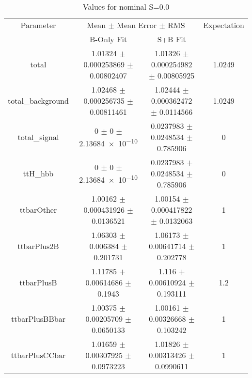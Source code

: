 \begin{table}
\centering
\caption{Values for nominal S=0.0}
\begin{tabular}{cccc}
\toprule
Parameter & \multicolumn{2}{c}{Mean $\pm$ Mean Error $\pm$ RMS} & Expectation\\
 & B-Only Fit & S+B Fit & \\
\midrule
total & \num{1.01324} $\pm$ \num{0.000253869} $\pm$ \num{0.00802407} & \num{1.01326} $\pm$ \num{0.000254982} $\pm$ \num{0.00805925} & \num{1.0249}\\
total\_background & \num{1.02468} $\pm$ \num{0.000256735} $\pm$ \num{0.00811461} & \num{1.02444} $\pm$ \num{0.000362472} $\pm$ \num{0.0114566} & \num{1.0249}\\
total\_signal & \num{0} $\pm$ \num{0} $\pm$ \num{2.13684e-10} & \num{0.0237983} $\pm$ \num{0.0248534} $\pm$ \num{0.785906} & \num{0}\\
ttH\_hbb & \num{0} $\pm$ \num{0} $\pm$ \num{2.13684e-10} & \num{0.0237983} $\pm$ \num{0.0248534} $\pm$ \num{0.785906} & \num{0}\\
ttbarOther & \num{1.00162} $\pm$ \num{0.000431926} $\pm$ \num{0.0136521} & \num{1.00154} $\pm$ \num{0.000417822} $\pm$ \num{0.0132063} & \num{1}\\
ttbarPlus2B & \num{1.06303} $\pm$ \num{0.006384} $\pm$ \num{0.201731} & \num{1.06173} $\pm$ \num{0.00641714} $\pm$ \num{0.202778} & \num{1}\\
ttbarPlusB & \num{1.11785} $\pm$ \num{0.00614686} $\pm$ \num{0.1943} & \num{1.116} $\pm$ \num{0.00610924} $\pm$ \num{0.193111} & \num{1.2}\\
ttbarPlusBBbar & \num{1.00375} $\pm$ \num{0.00205709} $\pm$ \num{0.0650133} & \num{1.00161} $\pm$ \num{0.00326668} $\pm$ \num{0.103242} & \num{1}\\
ttbarPlusCCbar & \num{1.01659} $\pm$ \num{0.00307925} $\pm$ \num{0.0973223} & \num{1.01826} $\pm$ \num{0.00313426} $\pm$ \num{0.0990611} & \num{1}\\
\bottomrule
\end{tabular}
\end{table}
